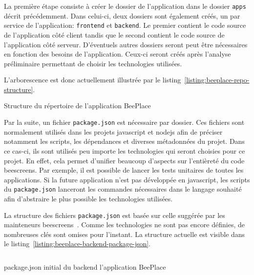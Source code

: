 La première étape consiste à créer le dossier de l'application dans le dossier \texttt{apps} décrit précédemment. Dans celui-ci, deux dossiers sont également créés, un par service de l'application: \texttt{frontend} et \texttt{backend}. Le premier contient le code source de l'application côté client tandis que le second contient le code source de l'application côté serveur. D'éventuels autres dossiers seront peut être nécessaires en fonction des besoins de l'application. Ceux-ci seront créés après l'analyse préliminaire permettant de choisir les technologies utilisées.

L'arborescence est donc actuellement illustrée par le listing~\ref{listing:beeplace-repo-structure}.

\begin{listing}[H]
  \begin{tcolorbox}[arc=0mm,colback=white!5!white]
  \end{tcolorbox}
  \caption{Structure du répertoire de l'application BeePlace}
  \label{listing:beeplace-repo-structure}
\end{listing}

Par la suite, un fichier \texttt{package.json} est nécessaire par dossier. Ces fichiers sont normalement utilisés dans les projets \gls{javascript} et \gls{nodejs} afin de préciser notamment les scripts, les dépendances et diverses métadonnées du projet. Dans ce cas-ci, ils sont utilisés peu importe les technologies qui seront choisies pour ce projet. En effet, cela permet d'unifier beaucoup d'aspects sur l'entièreté du code \gls{beescreens}. Par exemple, il est possible de lancer les tests unitaires de toutes les applications. Si la future application n'est pas développée en \gls{javascript}, les scripts du \texttt{package.json} lanceront les commandes nécessaires dans le langage souhaité afin d'abstraire le plus possible les technologies utilisées.

La structure des fichiers \texttt{package.json} est basée sur celle suggérée par les mainteneurs \gls{beescreens}~\cite{aboutpnpmbeescreens}. Comme les technologies ne sont pas encore définies, de nombreuses clés sont omises pour l'instant. La structure actuelle est visible dans le listing~\ref{listing:beeplace-backend-package-json}.

\begin{listing}[H]
  \inputminted[tabsize=4, linenos]{json}{assets/figures/package.json}
  \caption{package.json initial du backend l'application BeePlace}
  \label{listing:beeplace-backend-package-json}
\end{listing}

